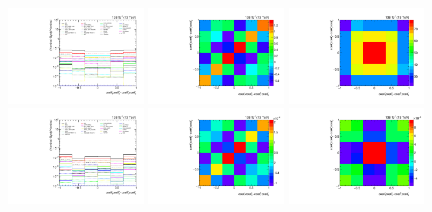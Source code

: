 \begin{figure}[htb]
\begin{center}
 \includegraphics[width=0.32\textwidth]{fig_fullRun2UL/unfolding/combined/deltaSystCombinedlog_rebinnedB_c_Mrk.pdf}
 \includegraphics[width=0.32\textwidth]{fig_fullRun2UL/unfolding/combined/StatCovMatrix_rebinnedB_c_Mrk.pdf}
 \includegraphics[width=0.32\textwidth]{fig_fullRun2UL/unfolding/combined/TotalSystCovMatrix_rebinnedB_c_Mrk.pdf} \\
 \includegraphics[width=0.32\textwidth]{fig_fullRun2UL/unfolding/combined/deltaSystCombinedlogNorm_rebinnedB_c_Mrk.pdf}
 \includegraphics[width=0.32\textwidth]{fig_fullRun2UL/unfolding/combined/StatCovMatrixNorm_rebinnedB_c_Mrk.pdf}
 \includegraphics[width=0.32\textwidth]{fig_fullRun2UL/unfolding/combined/TotalSystCovMatrixNorm_rebinnedB_c_Mrk.pdf} \\

\end{center}
\end{figure}
